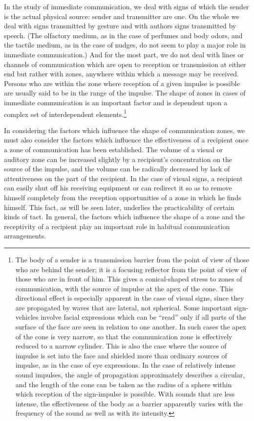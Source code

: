 \documentclass[openany,nobib]{tufte-book}
\begin{document}
In the study of immediate communication, we deal with signs of which the
sender is the actual physical source: sender and transmitter are one. On
the whole we deal with signs transmitted by gesture and with authors
signs transmitted by speech. (The olfactory medium, as in the case of
perfumes and body odors, and the tactile medium, as in the case of
nudges, do not seem to play a major role in immediate communication.)
And for the most part, we do not deal with lines or channels of
communication which are open to reception or transmission at either end
but rather with zones, anywhere within which a message may be received.
Persons who are within the zone where reception of a given impulse is
possible are usually said to be in the range of the impulse. The shape
of zones in cases of immediate communication is an important factor and
is dependent upon a complex set of interdependent elements.\footnote{The
  body of a sender is a transmission barrier from the point of view of
  those who are behind the sender; it is a focusing reflector from the
  point of view of those who are in front of him. This gives a
  conical-shaped stress to zones of communication, with the source of
  impulse at the apex of the cone. This directional effect is especially
  apparent in the case of visual signs, since they are propagated by
  waves that are lateral, not spherical. \textbar{} Some important
  sign-vehicles involve facial expressions which can be ``read'' only if
  all parts of the surface of the face are seen in relation to one
  another. In such cases the apex of the cone is very narrow, so that
  the communication zone is effectively reduced to a narrow cylinder.
  This is also the case where the source of impulse is set into the face
  and shielded more than ordinary sources of impulse, as in the case of
  eye expressions. \textbar{} In the case of relatively intense sound
  impulses, the angle of propagation approximately describes a circular,
  and the length of the cone can be taken as the radius of a sphere
  within which reception of the sign-impulse is possible. With sounds
  that are less intense, the effectiveness of the body as a barrier
  apparently varies with the frequency of the sound as well as with its
  intensity.}

In considering the factors which influence the shape of communication
zones, we must also consider the factors which influence the
effectiveness of a recipient once a zone of communication has been
established. The volume of a visual or auditory zone can be increased
slightly by a recipient's concentration on the source of the impulse,
and the volume can be radically decreased by lack of attentiveness on
the part of the recipient. In the case of visual signs, a recipient can
easily shut off his receiving equipment or can redirect it so as to
remove himself completely from the reception opportunities of a zone in
which he finds himself. This fact, as will be seen later, underlies the
practicability of certain kinds of tact. In general, the factors which
influence the shape of a zone and the receptivity of a recipient play an
important role in habitual communication arrangements.
\end{document}
